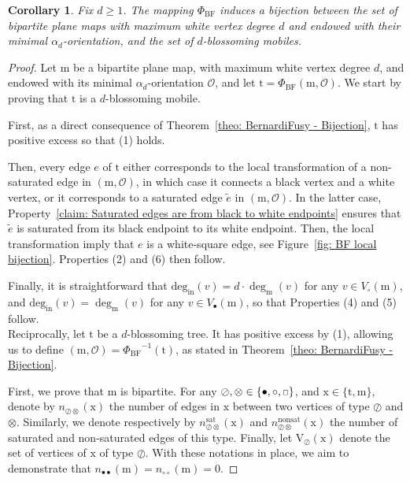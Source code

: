 \documentclass[11pt,reqno,tbtags]{amsart}
\newcommand{\rV}{\mathrm{V}}
\renewcommand{\rm}{\mathrm{m}}
\newcommand{\rt}{\mathrm{t}}
\newtheorem{coro}[theo]{Corollary}
\numberwithin{equation}{section}
\numberwithin{theo}{section}
\theoremstyle{definition}
\newcommand{\cO}{\mathcal{O}}
\newcommand{\ind}{\mathrm{deg_{in}}}
\begin{document}
\begin{coro}\label{cor: BF bij on alpha-orientations}
Fix $d\geq1$. The mapping $\Phi_{\mathrm{BF}}$ induces a bijection between the set of bipartite plane maps with maximum white vertex degree $d$ and endowed with their minimal $\alpha_d$-orientation, and the set of $d$-blossoming mobiles. 
\end{coro}
\begin{proof}
Let $\rm$ be a bipartite plane map, with maximum white vertex degree $d$, and endowed with its minimal $\alpha_d$-orientation $\cO$, and let $\rt=\Phi_{\mathrm{BF}}(\rm,\cO)$. We start by proving that $\rt$ is a $d$-blossoming mobile.

First, as a direct consequence of Theorem~\ref{theo: BernardiFusy - Bijection}, $\rt$ has positive excess so that (1) holds. 

Then, every edge $e$ of $\rt$ either corresponds to the local transformation of a non-saturated edge in $(\rm,\cO)$, in which case it connects a black vertex and a white vertex, or it corresponds to a saturated edge $\tilde{e}$ in $(\rm,\cO)$. In the latter case, Property~\ref{claim: Saturated edges are from black to white endpoints} ensures that $\tilde{e}$ is saturated from its black endpoint to its white endpoint. Then, the local transformation imply that $e$ is a white-square edge, see Figure~\ref{fig: BF local bijection}. Properties (2) and (6) then follow.  

Finally, it is straightforward that $\ind(v)=d\cdot\deg_\rm(v)$ for any $v\in V_\circ(\rm)$, and $\ind(v)=\deg_\rm(v)$ for any $v\in V_\bullet(\rm)$, so that Properties (4) and (5) follow.\\

Reciprocally, let $\rt$ be a $d$-blossoming tree. It has positive excess by (1), allowing us to define $(\rm,\cO)={\Phi_{\mathrm{BF}}}^{-1}(\rt)$, as stated in Theorem~\ref{theo: BernardiFusy - Bijection}.

First, we prove that $\rm$ is bipartite. For any ${\oslash},\otimes\in\{\bullet,\circ,\text{\tiny{$\square$}}\}$, and $\mathrm{x}\in\{\rt,\rm\}$, denote by $n_{\oslash\otimes}(\mathrm{x})$ the number of edges in $\mathrm{x}$ between two vertices of type $\oslash$ and $\otimes$. Similarly, we denote respectively by $n^{\mathrm{sat}}_{\oslash\otimes}(\mathrm{x})$ and $n^{\mathrm{non sat}}_{\oslash\otimes}(\mathrm{x})$ the number of saturated and non-saturated edges of this type. Finally, let $\rV_\oslash(\mathrm{x})$ denote the set of vertices of $\mathrm{x}$ of type $\oslash$. With these notations in place, we aim to demonstrate that $n_{\bullet\bullet}(\rm)=n_{\circ\circ}(\rm)=0$.


\end{proof}
\end{document}
